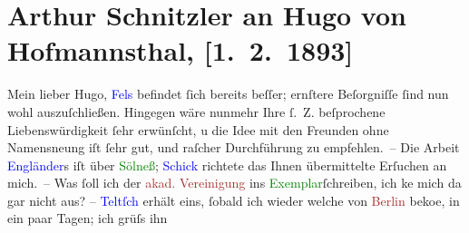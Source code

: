 

               \section[Arthur Schnitzler an Hugo von Hofmannsthal, {[}1. 2. 1893{]}]{ Arthur Schnitzler an Hugo von Hofmannsthal, {[}1. 2. 1893{]}}\nopagebreak{}\rehead{ }\normalsize\beginnumbering{} \toendnotes[C]{\smallbreak\pagebreak[2]} 
\toendnotes[C]{\smallbreak}\pstart{}{\pb}Mein lieber Hugo,\pend\pstart
           \textcolor{blue}{Fels}{}\ledrightnote{\textcolor{blue}{Friedrich Michael Fels}} befindet ſich bereits beſſer; ernſtere
               Beſorgniſſe ſind nun wohl auszuſchließen. Hingegen wäre nunmehr Ihre ſ. Z.
               beſprochene Liebenswürdigkeit ſehr erwünſcht, u die Idee mit den Freunden ohne
                  Namensne{\geminationn}ung iſt ſehr gut, und raſcher Durchführung
               zu empfehlen. –\pend
           \pstart
           Die Arbeit \textcolor{blue}{Engländer}{}\ledrightnote{\textcolor{blue}{Peter Altenberg}}s iſt über \textcolor{green}{Sölneß}{}\ledrightnote{\textcolor{green}{Baumeister Solness}}; \textcolor{blue}{Schick}{}\ledrightnote{\textcolor{blue}{Friedrich Schik}} richtete das
               Ihnen übermittelte Erſuchen an mich. –\pend
           \pstart
           Was ſoll ich der \textcolor{brown}{akad. Vereinigung}{}\ledrightnote{\textcolor{brown}{Wiener Akademische Vereinigung}} ins \textcolor{green}{Exemplar}{}ſchreiben, ich ke{\geminationn}
               mich da gar nicht aus? – \textcolor{blue}{Teltſch}{}\ledrightnote{\textcolor{blue}{Ede Telcs}} erhält eins, {\pb}ſobald ich wieder welche von \textcolor{brown}{Berlin}{}\ledrightnote{\textcolor{brown}{Bibliographisches Bureau}} beko{\geminationm}e, in ein paar Tagen; ich grüſs ihn
